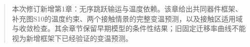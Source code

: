 \documentclass[11pt,a4paper]{article}
\begin{document}
\begin{titlepage}
\begin{abstract}
\par
{}
\medskip
\par\medskip
{\cjkfont 本次修订新增第1章：无序跳跃输运与温度依赖。该章给出共同器件框架、补充图S10的温度约束、两个接触情景的完整变温预测，以及接触区适用域与收敛检查。其余章节保留早期模型的条件性结果；旧固定迁移率曲线不能视为新增框架下已经验证的变温预测。}\par
\end{abstract}
\end{titlepage}
\setcounter{page}{1}
\end{document}
